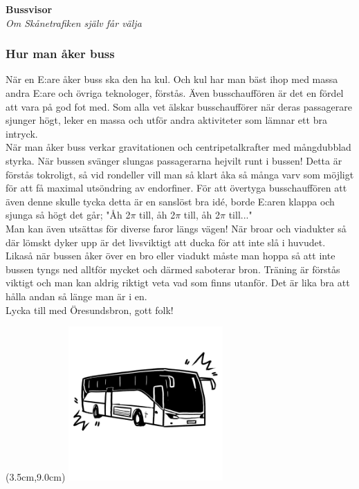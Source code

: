 \begin{center}
    \vspace*{1.5cm}
    {\fontsize{20}{20}\textbf{Bussvisor}}\\
    \vspace{0.7cm}
    {\fontsize{12}{12}\textit{Om Skånetrafiken själv får välja}}
\end{center}
\noBackground

\newpage
\resetBackground


\subsubsection*{Hur man åker buss}
När en E:are åker buss ska den ha kul. Och kul har man bäst ihop med 
massa andra E:are och övriga teknologer, förstås. Även busschauffören 
är det en fördel att vara på god fot med. Som alla vet älskar busschaufförer 
när deras passagerare sjunger högt, leker en massa och utför andra aktiviteter 
som lämnar ett bra intryck.
\\

När man åker buss verkar gravitationen och centripetalkrafter med 
mångdubblad styrka. När bussen svänger slungas passagerarna hejvilt 
runt i bussen! Detta är förstås tokroligt, så vid rondeller vill man 
så klart åka så många varv som möjligt för att få maximal utsöndring 
av endorfiner. För att övertyga busschauffören att även denne skulle 
tycka detta är en sanslöst bra idé, borde E:aren klappa och sjunga så 
högt det går; "Åh 2$\pi$ till, åh 2$\pi$ till, åh 2$\pi$ till..."
\\

Man kan även utsättas för diverse faror längs vägen! När broar 
och viadukter så där lömskt dyker upp är det livsviktigt att ducka 
för att inte slå i huvudet. Likaså när bussen åker över en bro eller 
viadukt måste man hoppa så att inte bussen tyngs ned alltför mycket 
och därmed saboterar bron. Träning är förstås viktigt och man kan 
aldrig riktigt veta vad som finns utanför. Det är lika bra att hålla 
andan så länge man är i en.
\\

Lycka till med Öresundsbron, gott folk!

\newpage
\noBackground
\begin{textblock*}{3cm}(3.5cm,9.0cm) %
    \includegraphics[width=5.9cm]{./bilder/ruths-bilder/buss.png}
\end{textblock*}

